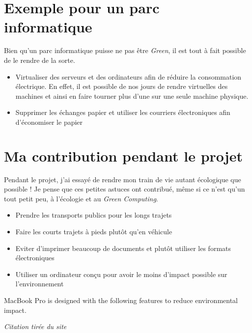 \section{Exemple pour un parc informatique} %
\label{sec:exemple_pour_un_parc_informatique}

Bien qu'un parc informatique puisse ne pas être \emph{Green}, il est tout à fait possible de le rendre de la sorte.

\medskip

\begin{itemize}
	\item Virtualiser des serveurs et des ordinateurs afin de réduire la consommation électrique. En effet, il est possible de nos jours de rendre virtuelles des machines et ainsi en faire tourner plus d'une sur une seule machine physique.
	\item Supprimer les échanges papier et utiliser les courriers électroniques afin d'économiser le papier
\end{itemize}

\section{Ma contribution pendant le projet} %
\label{sec:ma_contribution_pendant_le_projet}

Pendant le projet, j'ai essayé de rendre mon train de vie autant écologique que possible ! Je pense que ces petites astuces ont contribué, même si ce n'est qu'un tout petit peu, à l'écologie et au \emph{Green Computing}.

\medskip

\begin{itemize}
	\item Prendre les transports publics pour les longs trajets
	\item Faire les courts trajets à pieds plutôt qu'en véhicule
	\item Eviter d'imprimer beaucoup de documents  et plutôt utiliser les formats électroniques 
	\item Utiliser un ordinateur conçu pour avoir le moins d'impact possible sur l'environnement
\end{itemize}

\begin{shadequote}
MacBook Pro is designed with the following features to reduce environmental impact. \par\emph{Citation tirée du site \cite{online:apple:green}}
\end{shadequote}


